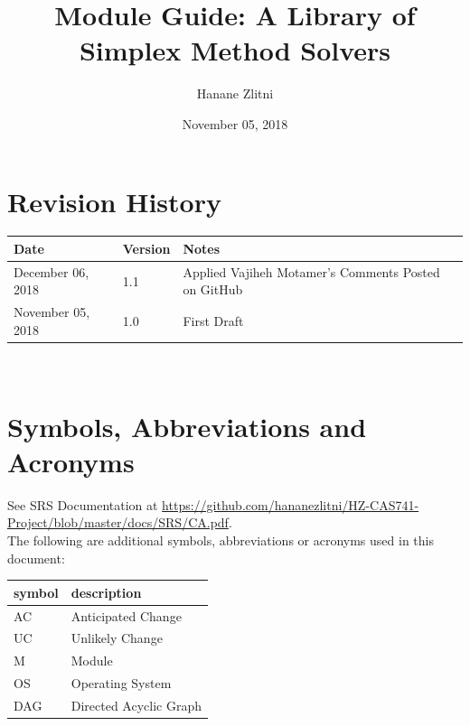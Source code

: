 \documentclass[12pt, titlepage]{article}
\begin{document}
\title{Module Guide: A Library of Simplex Method Solvers } 
\author{Hanane Zlitni}
\date{November 05, 2018}

\maketitle


\section{Revision History}

\begin{tabularx}{\textwidth}{p{3cm}p{2cm}X}
\toprule {\bf Date} & {\bf Version} & {\bf Notes}\\
\midrule
December 06, 2018 & 1.1 & Applied Vajiheh Motamer's Comments Posted on GitHub\\
November 05, 2018 & 1.0 & First Draft\\
\bottomrule
\end{tabularx}

~\newpage

\section{Symbols, Abbreviations and Acronyms}

See SRS Documentation at 
\url{https://github.com/hananezlitni/HZ-CAS741-Project/blob/master/docs/SRS/CA.pdf}.
\\

The following are additional symbols, abbreviations or acronyms used in this 
document: \\

\renewcommand{\arraystretch}{1.2}
\begin{tabular}{l l} 
	\toprule		
	\textbf{symbol} & \textbf{description}\\
	\midrule 
	AC & Anticipated Change\\
	UC & Unlikely Change\\
	M & Module\\
	OS & Operating System\\
	DAG & Directed Acyclic Graph\\
	\bottomrule
\end{tabular}\\

\newpage

\tableofcontents
\end{document}
